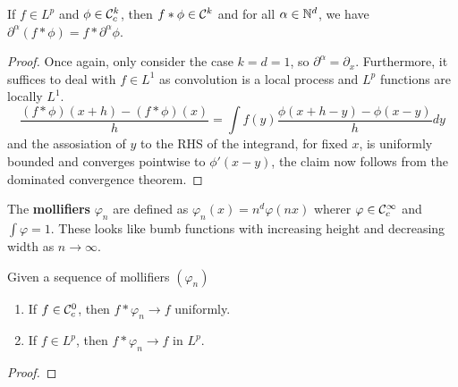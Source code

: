 \documentclass{article}
\begin{document}
\begin{proposition}
    If $f\in L^p$ and $\phi\in \mathcal{C}_c^k$, then $f*\phi\in\mathcal{C}^k$ and for all $\alpha\in\mathbb{N}^d$, we have $\partial^\alpha(f*\phi) = f*\partial^\alpha\phi$.
    \begin{proof}
        Once again, only consider the case $k=d=1$, so $\partial^\alpha = \partial_x$. Furthermore, it suffices to deal with $f\in L^1$ as convolution is a local process and $L^p$ functions are locally $L^1$. \[
        \frac{(f*\phi)(x+h)-(f*\phi)(x)}{h} = \int f(y)\frac{\phi(x+h-y)-\phi(x-y)}{h}dy
        \] and the assosiation of $y$ to the RHS of the integrand, for fixed $x$, is uniformly bounded and converges pointwise to $\phi'(x-y)$, the claim now follows from the dominated convergence theorem.
    \end{proof}
\end{proposition}

The \textbf{mollifiers} $\varphi_n$ are defined as $\varphi_n(x) = n^d\varphi(nx)$ wherer $\varphi\in\mathcal{C}^\infty_c$ and $\int\varphi=1$. These looks like bumb functions with increasing height and decreasing width as $n\rightarrow\infty$.

\begin{theorem}
    Given a sequence of mollifiers $(\varphi_n)$
    \begin{enumerate}
        \item If $f\in\mathcal{C}_c^0$, then $f*\varphi_n\rightarrow f$ uniformly.
        \item If $f\in L^p$, then $f*\varphi_n\rightarrow f$ in $L^p$.
    \end{enumerate}
    \begin{proof}
        
    \end{proof}
\end{theorem}
\end{document}
